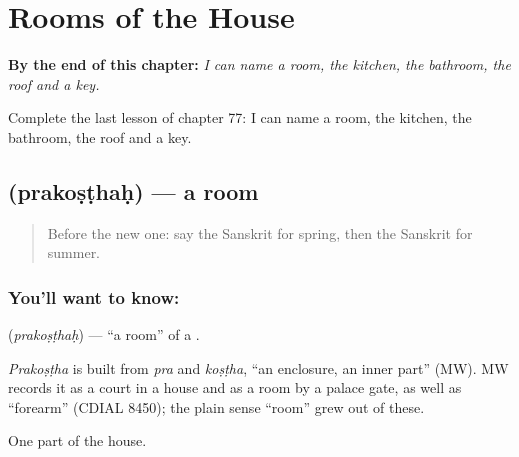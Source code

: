 
\chapter{Rooms of the House}
\label{ch:sa-rooms-of-the-house}

\begin{chapteropening}
\textbf{By the end of this chapter:} \emph{I can name a room, the kitchen, the bathroom, the roof and a key.}

Complete the last lesson of chapter 77: I can name a room, the kitchen, the bathroom, the roof and a key.
\end{chapteropening}

\section[\texorpdfstring{\sk{प्रकोष्ठः} (prakoṣṭhaḥ)}{प्रकोष्ठः (prakoṣṭhaḥ)}]{ (prakoṣṭhaḥ) — a room}

\label{lesson:SA-C77-room}



\begin{quote}
Before the new one: say the Sanskrit for spring, then the Sanskrit for summer.
\end{quote}

\subsection*{You'll want to know: }
\textbf{} (\emph{prakoṣṭhaḥ}) — \textquotedblleft{}a room\textquotedblright{} of a \textbf{}.

\begin{cousinweb}
\emph{Prakoṣṭha} is built from \emph{pra} and \emph{koṣṭha}, \textquotedblleft{}an enclosure, an inner part\textquotedblright{} (MW). MW records it as a court in a house and as a room by a palace gate, as well as \textquotedblleft{}forearm\textquotedblright{} (CDIAL 8450); the plain sense \textquotedblleft{}room\textquotedblright{} grew out of these.
\end{cousinweb}

\begin{grammarlens}[title={What you've built}]
One part of the house.
\end{grammarlens}

